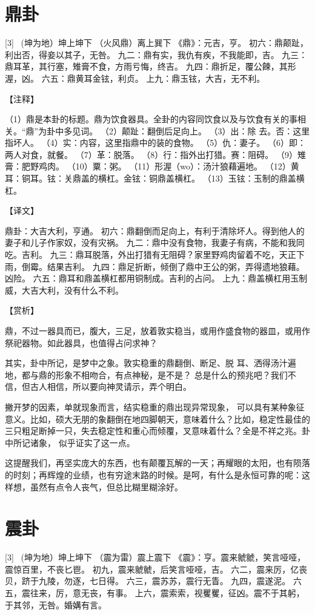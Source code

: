 \documentclass[12pt,UTF8]{ctexbook}
\begin{document}
\chapter{鼎卦}
[3] \ (坤为地）坤上坤下
（火风鼎）离上巽下
《鼎》：元吉，亨。
初六：鼎颠趾，利出否，得妾以其子，无咎。
九二：鼎有实，我仇有疾，不我能即，吉。
九三：鼎耳革，其行塞，雉膏不食，方雨亏悔，终吉。
九四：鼎折足，覆公餗，其形渥，凶。
六五：鼎黄耳金铉，利贞。
上九：鼎玉铉，大吉，无不利。

【注释】

（1）鼎是本卦的标题。鼎为饮食器具。全卦的内容同饮食以及与饮食有关的事相关。“鼎”为卦中多见词。
（2）颠趾：翻倒后足向上。
（3）出：除 去。否：这里指坏人。
（4）实：内容，这里指鼎中的装的食物。
（5）仇：妻子。
（6）即：两人对食，就餐。
（7）革：脱落。
（8）行：指外出打猎。赛：阻碍。
（9）雉膏：肥野鸡肉。
（10）粟：粥。
（11）形渥（wo）：汤汁狼藉遍地。
（12）黄耳：铜耳。铉：关鼎盖的横杠。金铉：铜鼎盖横杠。
（13）玉铉：玉制的鼎盖横杠。

【译文】

鼎卦：大吉大利，亨通。
初六：鼎翻倒而足向上，有利于清除坏人。得到他人的妻子和儿子作家奴，没有灾祸。
九二：鼎中没有食物，我妻子有病，不能和我同吃。吉利。
九三：鼎耳脱落，外出打猎有无阻碍？家里野鸡肉留着不吃，天正下雨，倒霉。结果吉利。
九四：鼎足折断，倾倒了鼎中王公的粥，弄得遗地狼藉。凶险。
六五：鼎耳和鼎盖横杠都用铜制成。吉利的占问。
上九：鼎盖横杠用玉制威，大吉大利，没有什么不利。

【赏析】

鼎，不过一器具而已，腹大，三足，放着敦实稳当，或用作盛食物的器皿，或用作祭祀器物。如此器具，也值得占问求神？

其实，卦中所记，是梦中之象。敦实稳重的鼎翻倒、断足、脱 耳、洒得汤汁遍地，都与鼎的形象不相吻合，有点神秘，是不是？ 总是什么的预兆吧？我们不信，但古人相信，所以要向神灵请示，弄个明白。

撇开梦的因素，单就现象而言，结实稳重的鼎出现异常现象， 可以具有某种象征意义。比如，硕大无朋的象翻倒在地四脚朝天，意味着什么？比如，稳定性最佳的三只粗足断掉一只，失去稳定性和重心而倾覆，叉意味着什么？全是不祥之兆。卦中所记诸象， 似乎证实了这一点。

这提醒我们，再坚实庞大的东西，也有颠覆瓦解的一天；再耀眼的太阳，也有陨落的时刻；再辉煌的业绩，也有穷途末路的时候。是呵，有什么是永恒可靠的呢：这样想，虽然有点令人丧气，但总比糊里糊涂好。

\chapter{震卦}
[3] \ (坤为地）坤上坤下
（震为雷）震上震下
《震》：亨。震来虩虩，笑言哑哑，震惊百里，不丧匕鬯。
初九，震来虩虩，后笑言哑哑，吉。
六二，震来厉，亿丧贝，跻于九陵，勿逐，七日得。
六三，震苏苏，震行无眚。
九四，震遂泥。
六五，震往来，厉，意无丧，有事。
上六，震索索，视矍矍，征凶。震不于其躬，于其邻，无咎。婚媾有言。
\end{document}
